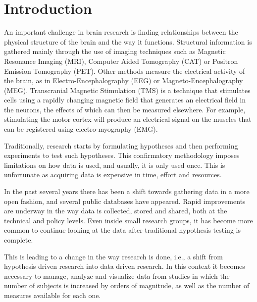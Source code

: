 \documentclass[utf8,paper]{frontiersSCNS} %
\begin{document}




\section{Introduction}


An important challenge in brain research is finding relationships between the physical structure of the brain and the way it functions. Structural information is gathered mainly through the use of imaging techniques such as Magnetic Resonance Imaging (MRI), Computer Aided Tomography (CAT) or Positron Emission Tomography (PET). Other methods measure the electrical activity of the brain, as in Electro-Encephalography (EEG) or Magneto-Encephalography (MEG). Transcranial Magnetic Stimulation (TMS) is a technique that stimulates cells using a rapidly changing magnetic field that generates an electrical field in the neurons, the effects of which can then be measured elsewhere. For example, stimulating the motor cortex will produce an electrical signal on the muscles that can be registered using electro-myography (EMG).


Traditionally, research starts by formulating hypotheses and then performing experiments to test such hypotheses. This  confirmatory methodology imposes limitations on how data is used, and usually, it is only used once. This is unfortunate as acquiring data is expensive in time, effort and resources.
					
In the past several years there has been a shift towards gathering data in a more open fashion, and several public databases have appeared. Rapid improvements are underway in the way data is collected, stored and shared, both at the technical and policy levels. Even inside small research groups, it has become more common to continue looking at the data after traditional hypothesis testing is complete.

				
This is leading to a change in the way research is done, i.e., a shift from hypothesis driven research into data driven research. In this context it  becomes necessary to manage, analyze and visualize data from studies in which the number of subjects is increased by orders of magnitude, as well as the number of measures available for each one. 
\end{document}
